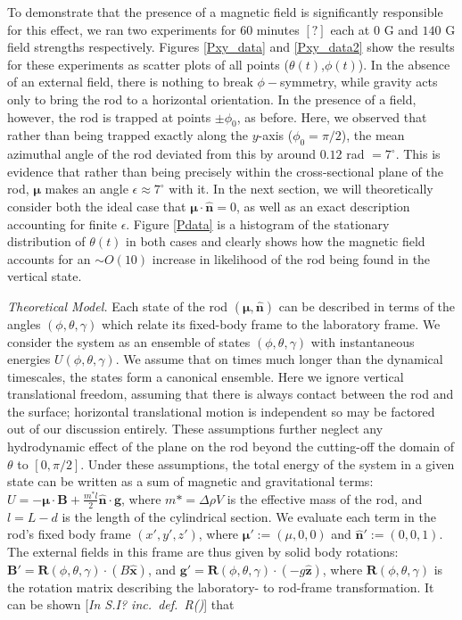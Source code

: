 \documentclass[aps,prl,twocolumn,superscriptaddress]{revtex4-1}
\newcommand{\vcrm}[1]{\mathbf{#1}}
\newcommand{\hvcrm}[1]{\mathbf{\hat{#1}}}
\newcommand{\vc}[1]{\boldsymbol{#1}}
\newcommand{\vm}{\vc{\mu}}
\newcommand{\vn}{\hvcrm{n}}
\newcommand{\vB}{\vcrm{B}}
\begin{document}
To demonstrate that the presence of a magnetic field is significantly responsible for this effect, we ran two experiments for 60 minutes $[?]$ each at $0$ G and $140$ G field strengths respectively. Figures \ref{Pxy_data} and \ref{Pxy_data2} show the results for these experiments as scatter plots of all points ($\theta(t)$,$\phi(t)$). In the absence of an external field, there is nothing to break $\phi-$symmetry, while gravity acts only to bring the rod to a horizontal orientation. In the presence of a field, however, the rod is trapped at points $\pm\phi_0$, as before. Here, we observed that rather than being trapped exactly along the $y$-axis ($\phi_0=\pi/2$), the mean azimuthal angle of the rod deviated from this by around $0.12$ rad $= 7^\circ$. This is evidence that rather than being precisely within the cross-sectional plane of the rod, $\vc{\mu}$ makes an angle $\epsilon\approx 7^\circ$ with it. In the next section, we will theoretically consider both the ideal case that $\vc{\mu}\cdot\hvcrm{n}=0$, as well as an exact description accounting for finite $\epsilon$. Figure \ref{Pdata} is a histogram of the stationary distribution of $\theta(t)$ in both cases and clearly shows how the magnetic field accounts for an $\sim O(10)$ increase in likelihood of the rod being found in the vertical state.

\emph{Theoretical Model.} Each state of the rod $(\vm,\vn)$ can be described in terms of the angles $(\phi, \theta, \gamma)$ which relate its fixed-body frame to the laboratory frame. We consider the system as an ensemble of states $(\phi,\theta,\gamma)$ with instantaneous energies $U(\phi,\theta,\gamma)$. We assume that on times much longer than the dynamical timescales, the states form a canonical ensemble. Here we ignore vertical translational freedom, assuming that there is always contact between the rod and the surface; horizontal translational motion is independent so may be factored out of our discussion entirely. These assumptions further neglect any hydrodynamic effect of the plane on the rod beyond the cutting-off the domain of $\theta$ to $[0,\pi/2]$. Under these assumptions, the total energy of the system in a given state can be written as a sum of magnetic and gravitational terms: $U = -\vm \cdot\vB + \frac{m^*l}{2} \vn \cdot \vcrm{g}$, where $m*=\Delta\rho V$ is the effective mass of the rod, and $l=L-d$ is the length of the cylindrical section. We evaluate each term in the rod's fixed body frame $(x',y',z')$, where $\vc{\mu}' :=(\mu,0,0)$ and $\hvcrm{n}' :=(0,0,1)$. The external fields in this frame are thus given by solid body rotations: $\vcrm{B}' = \vcrm{R}(\phi,\theta,\gamma)\cdot ( B \hvcrm{x})$, and $\vcrm{g}'= \vcrm{R}(\phi,\theta,\gamma)\cdot ( -g \hvcrm{z})$, where $\vcrm{R}(\phi,\theta,\gamma)$ is the rotation matrix describing the laboratory- to rod-frame transformation. It can be shown [\emph{In S.I? inc.\ def.\ R()}] that
\end{document}

